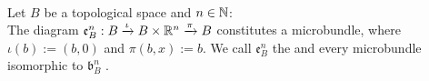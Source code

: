 \\Let $B$ be a topological space and $n \in \mathbb{N}$:
\\ The diagram $\mathfrak{e}^n_B: B \xrightarrow{\iota} B \times \mathbb{R}^n \xrightarrow{\pi} B{}$ constitutes a microbundle, where
$\iota(b) := (b, 0)$ and $\pi(b, x) := b$.
We call $\mathfrak{e}^n_B$ the  and every microbundle isomorphic to $\mathfrak{b}^n_B$ .